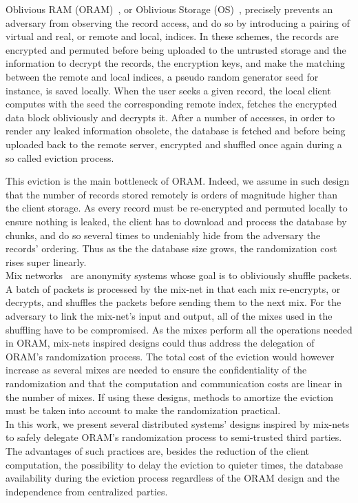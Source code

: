 \documentclass[USenglish,oneside,twocolumn]{article}
\begin{document}
Oblivious RAM (ORAM)~\cite{goldreich87}, or Oblivious Storage (OS)~\cite{boneh2011}, precisely prevents an adversary from observing the record access, and do so by introducing a pairing of virtual and real, or remote and local, indices. In these schemes, the records are encrypted and permuted before being uploaded to the untrusted storage and the information to decrypt the records, the encryption keys, and make the matching between the remote and local indices, a pseudo random generator seed for instance, is saved locally. When the user seeks a given record, the local client computes with the seed the corresponding remote index, fetches the encrypted data block obliviously and decrypts it. After a number of accesses, in order to render any leaked information obsolete, the database is fetched and before being uploaded back to the remote server, encrypted and shuffled once again during a so called eviction process.

This eviction is the main bottleneck of ORAM. Indeed, we assume in such design that the number of records stored remotely is orders of magnitude higher than the client storage. As every record must be re-encrypted and permuted locally to ensure nothing is leaked, the client has to download and process the database by chunks, and do so several times to undeniably hide from the adversary the records' ordering. Thus as the the database size grows, the randomization cost rises super linearly.\\

Mix networks~\cite{chaum1981untraceable} are anonymity systems whose goal is to obliviously shuffle packets. A batch of packets is processed by the mix-net in that each mix re-encrypts, or decrypts, and shuffles the packets before sending them to the next mix. For the adversary to link the mix-net's input and output, all of the mixes used in the shuffling have to be compromised.
As the mixes perform all the operations needed in ORAM, mix-nets inspired designs could thus address the delegation of ORAM's randomization process. The total cost of the eviction would however increase as several mixes are needed to ensure the confidentiality of the randomization and that the computation and communication costs are linear in the number of mixes. If using these designs, methods to amortize the eviction must be taken into account to make the randomization practical.\\

In this work, we present several distributed systems' designs inspired by mix-nets to safely delegate ORAM's randomization process to semi-trusted third parties.
The advantages of such practices are, besides the reduction of the client computation, the possibility to delay the eviction to quieter times, the database availability during the eviction process regardless of the ORAM design and the independence from centralized parties.
\end{document}
